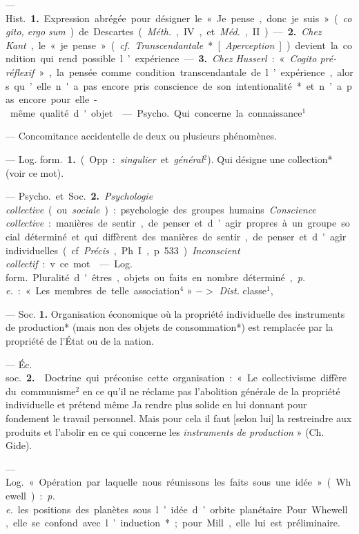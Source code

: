 \begin{itemize}[leftmargin=1cm, label=, itemsep=11pt]
 — \si{Hist.} {\bf 1.} Expression abrégée
pour désigner le « Je pense, donc je
suis » ({\it cogito, ergo sum}) de Descartes
({\it Méth.}, IV, et {\it Méd.}, II). — {\bf 2.} {\it Chez
Kant}, le « je pense » ({\it cf.} {\it Transcendantale}* [{\it Aperception}]) devient la
condition qui rend possible l’expérience. — {\bf 3.} {\it Chez Husserl} : « {\it Cogito
pré-réflexif} », la pensée comme condition transcendantale de l’expérience, alors qu’elle n'a pas encore
pris conscience de son intentionalité*
et n’a pas encore pour elle-même
qualité d'objet.

 — \si{Psycho.} Qui concerne la
connaissance$^1$

 — Concomitance accidentelle de deux ou plusieurs phénomènes.

 — \si{Log. form.} {\bf 1.} (Opp. : {\it singulier} et {\it général}$^2$). Qui désigne une
collection* (voir ce mot).

— \si{Psycho.} et \si{Soc.} {\bf 2.} {\it Psychologie
collective} (ou {\it sociale}) : psychologie
des groupes humains. {\it Conscience
collective} : manières de sentir, de
penser et d’agir propres à un groupe
social déterminé et qui diffèrent des
manières de sentir, de penser et
d'agir individuelles (cf. {\it Précis}, Ph. I,
p. 533). {\it Inconscient collectif} : v. ce
mot.

 — \si{Log. form.} Pluralité
d'êtres, objets ou faits en nombre
déterminé, {\it p. e.} : « Les membres de
telle association$^4$ » $->$ {\it Dist.} classe$^1$,

 — Soc.  {\bf 1.} Organisation économique où la propriété
individuelle des instruments de production* (mais non des objets de
consommation*) est remplacée par
la propriété de l’État ou de la nation.

— \si{Éc. soc.} {\bf 2.}  Doctrine qui préconise cette organisation : « Le collectivisme diffère du communisme$^2$
en ce qu'il ne réclame pas l'abolition
générale de la propriété individuelle
et prétend même Ja rendre plus
solide en lui donnant pour fondement le travail personnel. Mais pour
cela il faut [selon lui] la restreindre
aux produits et l’abolir en ce qui
concerne les {\it instruments de production} » (Ch. Gide).

 — \si{Log.} « Opération par
laquelle nous réunissons les faits
sous une idée » (Whewell) : {\it p. e.} les
positions des planètes sous l’idée
d’orbite planétaire. Pour Whewell,
elle se confond avec l’induction*;
pour Mill, elle lui est préliminaire.


\end{itemize}
